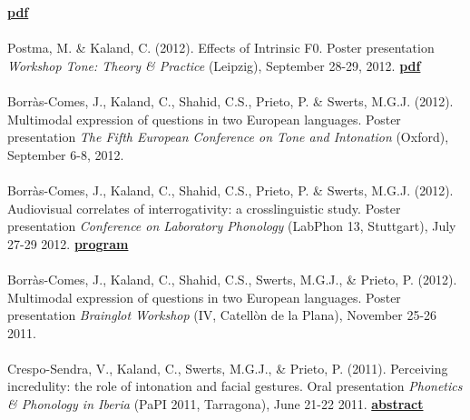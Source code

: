 \documentclass[a4paper,11pt]{article}
\begin{document}
 \textcolor{red}{\textbf{\lbrack\href{http://mindmodeling.org/cogsci2013/papers/0222/paper0222.pdf}{pdf}\rbrack}}\\\\
Postma, M. \& Kaland, C. (2012). Effects of Intrinsic F0. Poster presentation \textit{Workshop Tone: Theory \& Practice} (Leipzig), September 28-29, 2012. \textcolor{red}{\textbf{\lbrack\href{http://www.eva.mpg.de/lingua/conference/2012_Tone/pdf/Postma_Kaland_abstract.pdf}{pdf}\rbrack}}\\\\
Borr\`as-Comes, J., Kaland, C., Shahid, C.S., Prieto, P. \& Swerts, M.G.J. (2012). Multimodal expression of questions in two European languages. Poster presentation \textit{The Fifth European Conference on Tone and Intonation} (Oxford), September 6-8, 2012.\\\\
Borr\`as-Comes, J., Kaland, C., Shahid, C.S., Prieto, P. \& Swerts, M.G.J. (2012). Audiovisual correlates of interrogativity: a crosslinguistic study. Poster presentation \textit{Conference on Laboratory Phonology} (LabPhon 13, Stuttgart), July 27-29 2012. \textcolor{red}{\textbf{\lbrack\href{http://www.labphon.org/LabPhon13/program.html}{program}\rbrack}}\\\\
Borr\`as-Comes, J., Kaland, C., Shahid, C.S., Swerts, M.G.J., \& Prieto, P. (2012). Multimodal expression of questions in two European languages. Poster presentation \textit{Brainglot Workshop} (IV, Catell\`on de la Plana), November 25-26 2011.\\\\
Crespo-Sendra, V., Kaland, C., Swerts, M.G.J., \& Prieto, P. (2011). Perceiving incredulity: the role of intonation and facial gestures. Oral presentation \textit{Phonetics \& Phonology in Iberia} (PaPI 2011, Tarragona), June 21-22 2011. \textcolor{red}{\textbf{\lbrack\href{http://wwwa.urv.cat/deaa/PaPI2011/program_files/Perceiving\%20incredulity.pdf}{abstract}\rbrack}}\\\\

\vspace{-10mm}

\newpage
\end{document}
